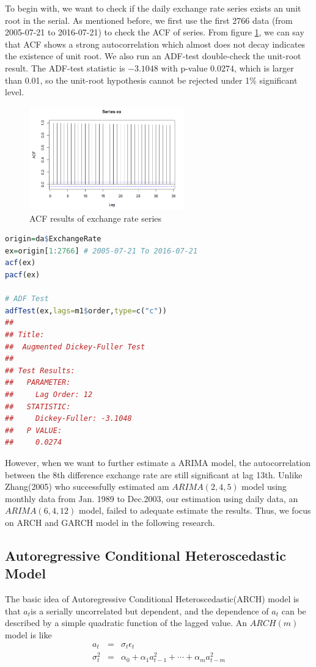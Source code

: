 \documentclass[12pt, a4paper, titlepage]{article}
\begin{document}
To begin with, we want to check if the daily exchange rate series exists an unit root in the serial. As mentioned before, we first use the first $2766$ data (from 2005-07-21 to 2016-07-21) to check the ACF of series. From figure \ref{ACF}, we can say that ACF shows a strong autocorrelation which almost does not decay indicates the existence of unit root. We also run an ADF-test double-check the unit-root result. The ADF-test statistic is $-3.1048$ with p-value $0.0274$, which is larger than 0.01, so the unit-root hypothesis cannot be rejected under 1\% significant level.\\
\begin{figure}[h!]
\begin{center}
\caption{ACF results of exchange rate series}\label{ACF}
\includegraphics[width=0.6\textwidth]{ex_acf.png} 
\end{center}
\end{figure}
\begin{lstlisting}[language=R] 
origin=da$ExchangeRate
ex=origin[1:2766] # 2005-07-21 To 2016-07-21
acf(ex)
pacf(ex)

# ADF Test
adfTest(ex,lags=m1$order,type=c("c"))
## 
## Title:
##  Augmented Dickey-Fuller Test
## 
## Test Results:
##   PARAMETER:
##     Lag Order: 12
##   STATISTIC:
##     Dickey-Fuller: -3.1048
##   P VALUE:
##     0.0274 
\end{lstlisting}

However, when we want to further estimate a ARIMA model, the autocorrelation between the 8th difference exchange rate are still significant at lag 13th. Unlike Zhang(2005) who successfully estimated am $ARIMA(2,4,5)$ model using monthly data from Jan. 1989 to Dec.2003, our estimation using daily data, an $ARIMA(6,4,12)$ model, failed to adequate estimate the results. Thus, we focus on ARCH and GARCH model in the following research.

\subsection{Autoregressive Conditional Heteroscedastic Model}
The basic idea of Autoregressive Conditional Heteroscedastic(ARCH) model is that ${a_t}$is a serially uncorrelated but dependent, and the dependence of $a_t$ can be described by a simple quadratic function of the lagged value. An $ARCH(m)$ model is like
\begin{eqnarray*}
a_t &=& \sigma_t \epsilon_t \\
\sigma_t^2 &=& \alpha_0 + \alpha_1 a_{t-1}^2 + \cdots +\alpha_m a_{t-m}^2
\end{eqnarray*}
\end{document}
